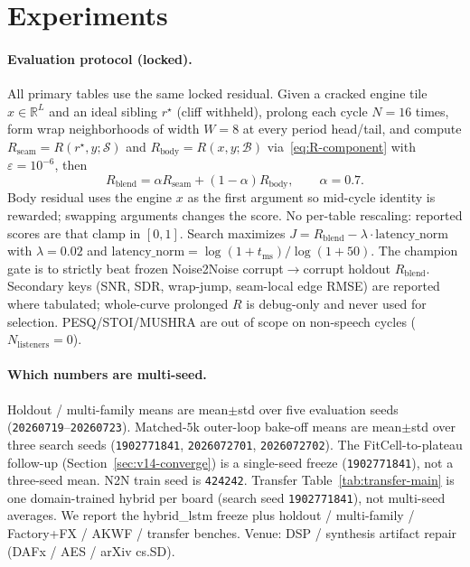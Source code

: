 \section{Experiments}
\label{sec:experiments}

\paragraph{Evaluation protocol (locked).}
\label{sec:eval-protocol}
All primary tables use the same locked residual.
Given a cracked engine tile $x\in\mathbb{R}^{L}$ and an ideal sibling $r^{\star}$ (cliff withheld),
prolong each cycle $N{=}16$ times, form wrap neighborhoods of width $W{=}8$ at every period head/tail,
and compute $R_{\mathrm{seam}}=R(r^{\star},y;\mathcal{S})$ and $R_{\mathrm{body}}=R(x,y;\mathcal{B})$ via~\eqref{eq:R-component} with $\varepsilon=10^{-6}$, then
\[
R_{\mathrm{blend}}=\alpha R_{\mathrm{seam}}+(1-\alpha)R_{\mathrm{body}},\qquad\alpha{=}0.7.
\]
Body residual uses the engine $x$ as the first argument so mid-cycle identity is rewarded; swapping arguments changes the score.
No per-table rescaling: reported scores are that clamp in $[0,1]$.
Search maximizes
$J=R_{\mathrm{blend}}-\lambda\cdot\mathrm{latency\_norm}$ with $\lambda{=}0.02$ and
$\mathrm{latency\_norm}=\log(1{+}t_{\mathrm{ms}})/\log(1{+}50)$.
The champion gate is to strictly beat frozen Noise2Noise corrupt$\to$corrupt holdout $R_{\mathrm{blend}}$.
Secondary keys (SNR, SDR, wrap-jump, seam-local edge RMSE) are reported where tabulated;
whole-curve prolonged $R$ is debug-only and never used for selection.
PESQ/STOI/MUSHRA are out of scope on non-speech cycles ($N_{\mathrm{listeners}}{=}0$).

\paragraph{Which numbers are multi-seed.}
Holdout / multi-family means are mean$\pm$std over five evaluation seeds (\texttt{20260719}--\texttt{20260723}).
Matched-$5$k outer-loop bake-off means are mean$\pm$std over three search seeds (\texttt{1902771841}, \texttt{2026072701}, \texttt{2026072702}).
The FitCell-to-plateau follow-up (Section~\ref{sec:v14-converge}) is a single-seed freeze (\texttt{1902771841}), not a three-seed mean.
N2N train seed is \texttt{424242}.
Transfer Table~\ref{tab:transfer-main} is one domain-trained hybrid per board (search seed \texttt{1902771841}), not multi-seed averages.
We report the hybrid\_lstm freeze plus holdout / multi-family / Factory+FX / AKWF / transfer benches.
Venue: DSP / synthesis artifact repair (DAFx / AES / arXiv cs.SD).


